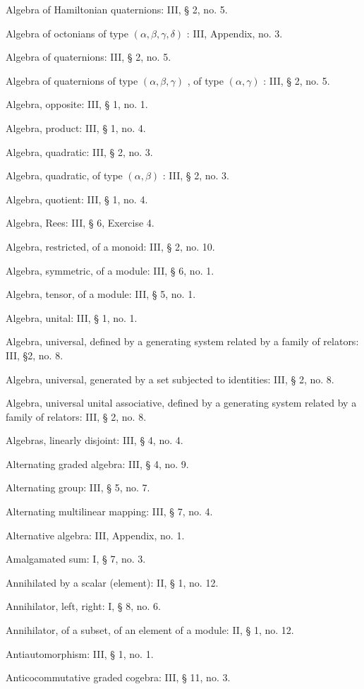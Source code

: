 Algebra of Hamiltonian quaternions: III, § 2, no. 5.

Algebra of octonians of type \((\alpha, \beta, \gamma, \delta)\) : III, Appendix, no. 3.

Algebra of quaternions: III, § 2, no. 5.

Algebra of quaternions of type \((\alpha, \beta, \gamma)\) , of type \((\alpha, \gamma)\) : III, § 2, no. 5.

Algebra, opposite: III, § 1, no. 1.

Algebra, product: III, § 1, no. 4.

Algebra, quadratic: III, § 2, no. 3.

Algebra, quadratic, of type \((\alpha, \beta)\) : III, § 2, no. 3.

Algebra, quotient: III, § 1, no. 4.

Algebra, Rees: III, § 6, Exercise 4.

Algebra, restricted, of a monoid: III, § 2, no. 10.

Algebra, symmetric, of a module: III, § 6, no. 1.

Algebra, tensor, of a module: III, § 5, no. 1.

Algebra, unital: III, § 1, no. 1.

Algebra, universal, defined by a generating system related by a family of relators: III, §2, no. 8.

Algebra, universal, generated by a set subjected to identities: III, § 2, no. 8.

Algebra, universal unital associative, defined by a generating system related by a family of relators: III, § 2, no. 8.

Algebras, linearly disjoint: III, § 4, no. 4.

Alternating graded algebra: III, § 4, no. 9.

Alternating group: III, § 5, no. 7.

Alternating multilinear mapping: III, § 7, no. 4.

Alternative algebra: III, Appendix, no. 1.

Amalgamated sum: I, § 7, no. 3.

Annihilated by a scalar (element): II, § 1, no. 12.

Annihilator, left, right: I, § 8, no. 6.

Annihilator, of a subset, of an element of a module: II, § 1, no. 12.

Antiautomorphism: III, § 1, no. 1.

Anticocommutative graded cogebra: III, § 11, no. 3.

